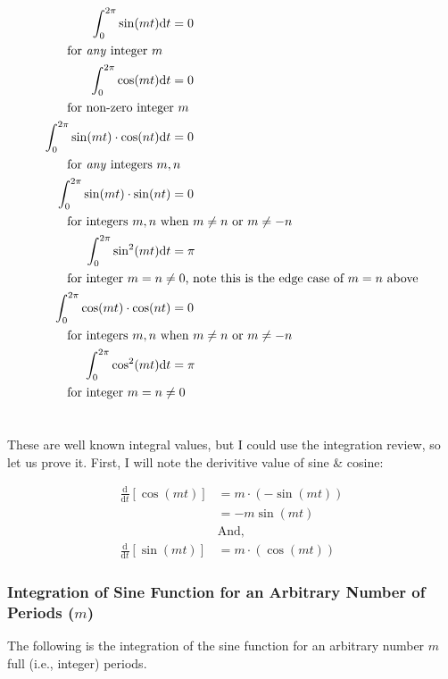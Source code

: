 \documentclass[10pt]{article} %
\begin{document}
\begin{align}
    \int_0^{2\pi} \sin(mt)\mathrm{d}t &= 0 \\
    \intertext{\hspace{0.5cm} for \textit{any} integer $m$}
    \int_0^{2\pi} \cos(mt)\mathrm{d}t &= 0 \\
    \intertext{\hspace{0.5cm} for non-zero integer $m$}
    \int_0^{2\pi} \sin(mt) \cdot \cos(nt)\mathrm{d}t &= 0 \\
    \intertext{\hspace{0.5cm} for \textit{any} integers $m, n$}
    \int_0^{2\pi} \sin(mt) \cdot \sin(nt) &= 0 \\
    \intertext{\hspace{0.5cm} for integers $m,n$ when $m \neq n$ or $m \neq -n$}
    \int_0^{2\pi} \sin^2(mt)\mathrm{d}t &= \pi \\
    \intertext{\hspace{0.5cm} for integer $m = n \neq 0$, note this is the edge case of $m=n$ above}
    \int_0^{2\pi} \cos(mt) \cdot \cos(nt) &= 0 \\
    \intertext{\hspace{0.5cm} for integers $m,n$ when $m \neq n$ or $m \neq -n$}
    \int_0^{2\pi} \cos^2(mt)\mathrm{d}t &= \pi \\
    \intertext{\hspace{0.5cm} for integer $m = n \neq 0$} \notag
\end{align}

These are well known integral values, but I could use the integration review, so let us prove it. First, I will note the derivitive value of sine \& cosine:

\begin{align*}
    \frac{\mathrm{d}}{\mathrm{d}t}[\cos(mt)] & = m\cdot\left(-\sin(mt)\right) \\
    & = -m\sin(mt)\\
    &\text{And,}\\
    \frac{\mathrm{d}}{\mathrm{d}t}[\sin(mt)] & = m\cdot\left(\cos(mt)\right)
\end{align*}

\subsubsection{Integration of Sine Function for an Arbitrary Number of Periods ($m$)}

The following is the integration of the sine function for an arbitrary number $m$ full (i.e., integer) periods.
\end{document}
